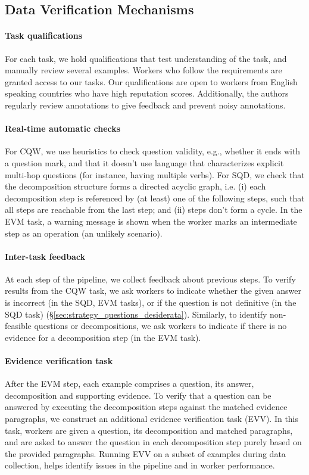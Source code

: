 {\subsection{Data Verification Mechanisms}
\label{subsection:verification}

\paragraph{Task qualifications} For each task, we hold qualifications that test understanding of the task, and manually review several examples. Workers who follow the requirements are granted access to our tasks. Our qualifications are open to workers from English speaking countries who have high reputation scores. %
Additionally, the authors regularly review annotations to give feedback and prevent noisy annotations.

\paragraph{Real-time automatic checks} 
For CQW, we use heuristics to check question validity, e.g., whether it ends with a question mark, and that it doesn't use language that characterizes explicit multi-hop questions (for instance, having multiple verbs). 
For SQD, we check that the decomposition structure forms a directed acyclic graph, i.e. (i) each decomposition step is referenced by (at least) one of the following steps, such that all steps are reachable from the last step; and (ii) steps don't form a cycle. 
In the EVM task, a warning message is shown when the worker marks an intermediate step as an operation (an unlikely scenario).

\paragraph{Inter-task feedback} At each step of the pipeline, we collect feedback about previous steps.
To verify results from the CQW task, we ask workers to indicate whether the given answer is incorrect (in the SQD, EVM tasks), or if the question is not definitive (in the SQD task) (\S\ref{sec:strategy_questions_desiderata}).
Similarly, to identify non-feasible questions or decompositions, we ask workers to indicate if there is no evidence for a decomposition step (in the EVM task).

\paragraph{Evidence verification task} 
After the EVM step, each example comprises a question, its answer, decomposition and supporting evidence.
To verify that a question can be answered by executing the decomposition steps against the matched evidence paragraphs, we construct an additional evidence verification task (EVV). In this task, workers are given a question, its decomposition and matched paragraphs, and are asked to answer the question in each decomposition step purely based on the provided paragraphs. Running EVV on a subset of examples during data collection, helps identify issues in the pipeline and in worker performance. 

}
